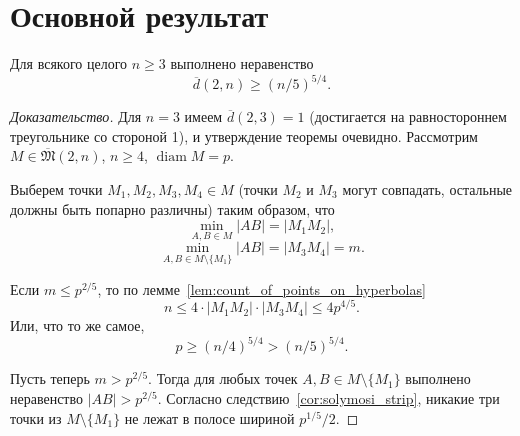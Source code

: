 \documentclass[11pt,twoside,draft
]{article}
\begin{document}
\section{Основной результат}

\begin{theorem}
	\label{thm:main_result}
	Для всякого целого $n \geq 3$ выполнено неравенство
	\begin{equation}
		\overline{d}(2,n) \geq (n/5)^{5/4}
		.
	\end{equation}
\end{theorem}

\begin{proof}[Доказательство]
	Для $n = 3$ имеем $\overline{d}(2,3) = 1$ (достигается на равностороннем треугольнике со стороной 1),
	и утверждение теоремы очевидно.
	Рассмотрим $M\in\overline{\mathfrak{M}}(2,n)$, $n \geq 4$, $\operatorname{diam} M = p$.

	Выберем точки $M_1, M_2, M_3, M_4 \in M$
	(точки $M_2$ и $M_3$ могут совпадать, остальные должны быть попарно различны) таким образом, что
	\begin{equation}
		\min_{A, B \in M} |AB| = |M_1 M_2|
		,
	\end{equation}
	\begin{equation}
		\min_{A, B \in M \setminus \{M_1\}} |AB| = |M_3 M_4| = m
		.
	\end{equation}

	Если $m \leq p^{2/5}$, то по лемме~\ref{lem:count_of_points_on_hyperbolas}
	\begin{equation}
		n \leq 4 \cdot |M_1 M_2| \cdot |M_3 M_4| \leq  4 p^{4/5}
		.
	\end{equation}
	Или, что то же самое,
	\begin{equation}
		\label{eq:hyperbolas_5_4}
		p \geq (n/4) ^ {5/4} > (n/5) ^ {5/4}
		.
	\end{equation}

	Пусть теперь $m > p^{2/5}$.
	Тогда для любых точек $A,B \in M\setminus\{M_1\}$ выполнено неравенство $|AB| > p^{2/5}$.
	Согласно следствию~\ref{cor:solymosi_strip}, никакие три точки из  $M\setminus\{M_1\}$
	не лежат в полосе шириной $p^{1/5} / 2$.




\end{proof}
\end{document}
